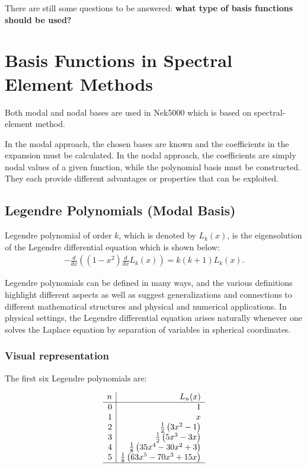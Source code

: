 \documentclass[
  a4paper,
  10pt]{article}
\begin{document}
There are still some questions to be answered: \textbf{what type of
basis functions should be used?}

\hypertarget{basis-functions-in-spectral-element-methods}{%
\section{Basis Functions in Spectral Element
Methods}\label{basis-functions-in-spectral-element-methods}}

Both modal and nodal bases are used in Nek5000 which is based on spectral-element method.

In the modal approach, the chosen bases are known and the
coefficients in the expansion must be calculated. In the nodal approach, the coefficients are simply nodal values of a given function, while the polynomial basis must be constructed. They each provide different advantages or properties that can be
exploited.

\hypertarget{legendre-polynomials-modal-basis}{%
\subsection{Legendre Polynomials (Modal
Basis)}\label{legendre-polynomials-modal-basis}}

Legendre polynomial of order \(k\), which is denoted by \(L_k(x)\), is
the eigensolution of the Legendre differential equation which is shown
below: \begin{align}
{\displaystyle {-\frac {d}{dx}}\left(\left(1-x^{2}\right){\frac {d}{dx}L_k(x)}\right)=k(k+1)L_k(x)}.
\end{align}

Legendre polynomials can be defined in many ways, and the various
definitions highlight different aspects as well as suggest
generalizations and connections to different mathematical structures and
physical and numerical applications. In physical settings, the Legendre differential equation arises naturally whenever one solves the Laplace equation by separation of
variables in spherical coordinates.

\hypertarget{visual-representation}{%
\subsubsection{Visual representation}\label{visual-representation}}

The first six Legendre polynomials are:

\[
\begin{array}{r|r}
 n & L_n(x) \\
\hline
 0 & 1 \\ 
 1 & x \\
 2 & \tfrac12 \left(3x^2-1\right) \\
 3 & \tfrac12 \left(5x^3-3x\right) \\
 4 & \tfrac18 \left(35x^4-30x^2+3\right) \\
 5 & \tfrac18 \left(63x^5-70x^3+15x\right) \\
\hline
\end{array}
\]
\end{document}
